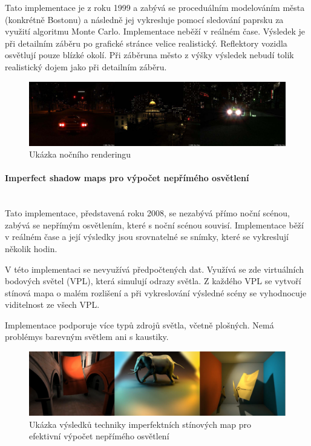 \documentclass[11pt,twoside,a4paper]{book}
\begin{document}
Tato implementace je z roku 1999 a zabývá se proceduálním modelováním města (konkrétně Bostonu) a následně jej vykresluje pomocí sledování paprsku za využití algoritmu Monte Carlo. Implementace neběží v reálném čase. Výsledek je při detailním záběru po grafické stránce velice realistický. Reflektory vozidla osvětlují pouze blízké okolí. Při záběru\linebreak na město z výšky výsledek nebudí tolik realistický dojem jako při detailním záběru.

\begin{center}
\begin{figure}[h!]
\includegraphics[width=150mm]{figures/NR.png}
\caption{Ukázka nočního renderingu}
\end{figure}
\end{center}

\paragraph{Imperfect shadow maps pro výpočet nepřímého osvětlení}\mbox{}\\

Tato implementace, představená roku 2008, se nezabývá přímo noční scénou, zabývá se nepřímým osvětlením, které s noční scénou souvisí. Implementace běží v reálném čase a její výsledky jsou srovnatelné se snímky, které se vykreslují několik hodin.

V této implementaci se nevyužívá předpočtených dat. Využívá se zde virtuálních bodových světel (VPL), která simulují odrazy světla. Z každého VPL se vytvoří stínová mapa o malém rozlišení a při vykreslování výsledné scény se vyhodnocuje viditelnost ze všech VPL.

Implementace podporuje více typů zdrojů světla, včetně plošných. Nemá problémy\linebreak s barevným světlem ani s kaustiky.

\begin{figure}[h!]
\begin{center}
\includegraphics[width=150mm]{figures/ISM.png}
\caption{Ukázka výsledků techniky imperfektních stínových map pro efektivní výpočet nepřímého osvětlení \cite{Ritschel:2008:ISM}}
\end{center}
\end{figure}
\newpage
\end{document}
